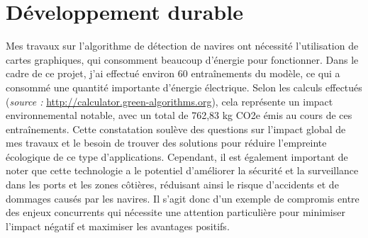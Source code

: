 \section{Développement durable}

Mes travaux sur l'algorithme de détection de navires ont nécessité l'utilisation 
de cartes graphiques, qui consomment beaucoup d'énergie pour fonctionner. 
Dans le cadre de ce projet, j'ai effectué environ 60 entraînements du modèle, 
ce qui a consommé une quantité importante d'énergie électrique. 
Selon les calculs effectués (\textit{source : }\url{http://calculator.green-algorithms.org}), 
cela représente un impact environnemental notable, 
avec un total de 762,83 kg CO2e émis au cours de ces entraînements. 
Cette constatation soulève des questions sur l'impact global de mes travaux 
et le besoin de trouver des solutions pour réduire l'empreinte écologique de ce type d'applications. 
Cependant, il est également important de noter que cette technologie a le potentiel 
d'améliorer la sécurité et la surveillance dans les ports et les zones côtières, 
réduisant ainsi le risque d'accidents et de dommages causés par les navires. 
Il s'agit donc d'un exemple de compromis entre des enjeux concurrents qui 
nécessite une attention particulière pour minimiser l'impact négatif et maximiser les avantages positifs.